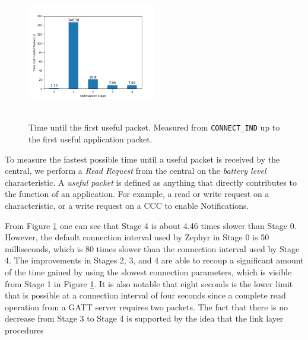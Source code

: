 \begin{figure}[]
    \centering
    \includegraphics[width=0.5\textwidth,height=6cm,keepaspectratio=true]{plots/static_useful_packet_time.png}
    \caption{
        Time until the first useful packet. Measured from \texttt{CONNECT\_IND} up to the first useful application packet.
    }
    \label{fig:static_useful_packet_time}
\end{figure}

To measure the fastest possible time until a useful packet is received by the central, we perform a \textit{Read Request} from the central on the \textit{battery level} characteristic. A \textit{useful packet} is defined as anything that directly contributes to the function of an application. For example, a read or write request on a characteristic, or a write request on a CCC to enable Notifications. 

From Figure \ref{fig:static_useful_packet_time} one can see that Stage 4 is about 4.46 times slower than Stage 0. However, the default connection interval used by Zephyr in Stage 0 is 50 milliseconds, which is 80 times slower than the connection interval used by Stage 4. The improvements in Stages 2, 3, and 4 are able to recoup a significant amount of the time gained by using the slowest connection parameters, which is visible from Stage 1 in Figure \ref{fig:static_useful_packet_time}. It is also notable that eight seconds is the lower limit that is possible at a connection interval of four seconds since a complete read operation from a GATT server requires two packets. The fact that there is no decrease from Stage 3 to Stage 4 is supported by the idea that the link layer procedures 

